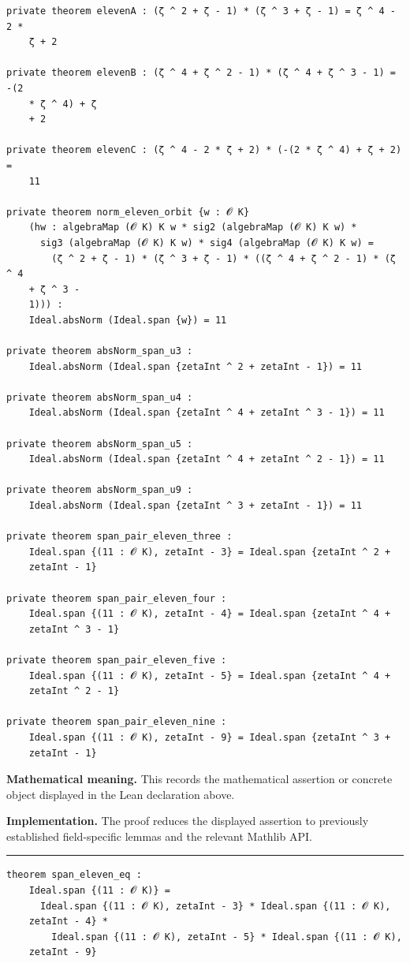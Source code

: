 \documentclass[UTF8,a4paper,11pt,fontset=fandol]{ctexart}
\theoremstyle{definition}
\newcommand{\statementsep}{\par\medskip\hrule\medskip}
\begin{document}
\begin{verbatim}
private theorem elevenA : (ζ ^ 2 + ζ - 1) * (ζ ^ 3 + ζ - 1) = ζ ^ 4 - 2 *
    ζ + 2

private theorem elevenB : (ζ ^ 4 + ζ ^ 2 - 1) * (ζ ^ 4 + ζ ^ 3 - 1) = -(2
    * ζ ^ 4) + ζ
    + 2

private theorem elevenC : (ζ ^ 4 - 2 * ζ + 2) * (-(2 * ζ ^ 4) + ζ + 2) =
    11

private theorem norm_eleven_orbit {w : 𝓞 K}
    (hw : algebraMap (𝓞 K) K w * sig2 (algebraMap (𝓞 K) K w) *
      sig3 (algebraMap (𝓞 K) K w) * sig4 (algebraMap (𝓞 K) K w) =
        (ζ ^ 2 + ζ - 1) * (ζ ^ 3 + ζ - 1) * ((ζ ^ 4 + ζ ^ 2 - 1) * (ζ ^ 4
    + ζ ^ 3 -
    1))) :
    Ideal.absNorm (Ideal.span {w}) = 11

private theorem absNorm_span_u3 :
    Ideal.absNorm (Ideal.span {zetaInt ^ 2 + zetaInt - 1}) = 11

private theorem absNorm_span_u4 :
    Ideal.absNorm (Ideal.span {zetaInt ^ 4 + zetaInt ^ 3 - 1}) = 11

private theorem absNorm_span_u5 :
    Ideal.absNorm (Ideal.span {zetaInt ^ 4 + zetaInt ^ 2 - 1}) = 11

private theorem absNorm_span_u9 :
    Ideal.absNorm (Ideal.span {zetaInt ^ 3 + zetaInt - 1}) = 11

private theorem span_pair_eleven_three :
    Ideal.span {(11 : 𝓞 K), zetaInt - 3} = Ideal.span {zetaInt ^ 2 +
    zetaInt - 1}

private theorem span_pair_eleven_four :
    Ideal.span {(11 : 𝓞 K), zetaInt - 4} = Ideal.span {zetaInt ^ 4 +
    zetaInt ^ 3 - 1}

private theorem span_pair_eleven_five :
    Ideal.span {(11 : 𝓞 K), zetaInt - 5} = Ideal.span {zetaInt ^ 4 +
    zetaInt ^ 2 - 1}

private theorem span_pair_eleven_nine :
    Ideal.span {(11 : 𝓞 K), zetaInt - 9} = Ideal.span {zetaInt ^ 3 +
    zetaInt - 1}
\end{verbatim}
\noindent\textbf{Mathematical meaning.} This records the mathematical assertion or concrete object displayed in the Lean declaration above.\par
\noindent\textbf{Implementation.} The proof reduces the displayed assertion to previously established field-specific lemmas and the relevant Mathlib API.\par
\statementsep
\begin{verbatim}
theorem span_eleven_eq :
    Ideal.span {(11 : 𝓞 K)} =
      Ideal.span {(11 : 𝓞 K), zetaInt - 3} * Ideal.span {(11 : 𝓞 K),
    zetaInt - 4} *
        Ideal.span {(11 : 𝓞 K), zetaInt - 5} * Ideal.span {(11 : 𝓞 K),
    zetaInt - 9}
\end{verbatim}
\end{document}
